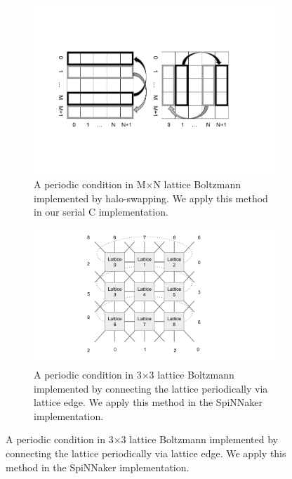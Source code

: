 \begin{figure}[!tb]

\begin{subfigure}[b]{1\textwidth}
       \centering
       \includegraphics[width=1\textwidth]{figures/haloswap.png}
       \caption{A periodic condition in M$\times$N lattice Boltzmann implemented by halo-swapping. We apply this method in our serial C implementation.}
       \label{fig:haloswap}
   \end{subfigure}

   \begin{subfigure}[b]{1\textwidth}
       \includegraphics[width=\textwidth]{figures/2dfabric.png}
       \caption{A periodic condition in 3$\times$3 lattice Boltzmann implemented by connecting the lattice periodically via lattice edge. We apply this method in the SpiNNaker implementation.}
       \label{fig:}
   \end{subfigure}
\end{figure}

